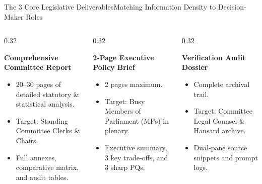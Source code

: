 \documentclass[aspectratio=169, 10pt]{beamer}
\begin{document}
\begin{frame}{The 3 Core Legislative Deliverables}{Matching Information Density to Decision-Maker Roles}
  \begin{columns}[t]
    \begin{column}{0.32\textwidth}
      \begin{tcolorbox}[colback=lightgrey, colframe=tanzaniablue, arc=1.2mm, boxrule=0.7pt, title=\textbf{Deliverable 1: Report}]
        \scriptsize
        \textbf{\textcolor{tanzaniablue}{Comprehensive Committee Report}}
        \begin{itemize}
          \item 20--30 pages of detailed statutory \& statistical analysis.
          \item Target: Standing Committee Clerks \& Chairs.
          \item Full annexes, comparative matrix, and audit tables.
        \end{itemize}
      \end{tcolorbox}
    \end{column}
    \begin{column}{0.32\textwidth}
      \begin{tcolorbox}[colback=lightgrey, colframe=suagreen, arc=1.2mm, boxrule=0.7pt, title=\textbf{Deliverable 2: Brief}]
        \scriptsize
        \textbf{\textcolor{suagreen}{2-Page Executive Policy Brief}}
        \begin{itemize}
          \item 2 pages maximum.
          \item Target: Busy Members of Parliament (MPs) in plenary.
          \item Executive summary, 3 key trade-offs, and 3 sharp PQs.
        \end{itemize}
      \end{tcolorbox}
    \end{column}
    \begin{column}{0.32\textwidth}
      \begin{tcolorbox}[colback=lightgrey, colframe=darkcharcoal, arc=1.2mm, boxrule=0.7pt, title=\textbf{Deliverable 3: Dossier}]
        \scriptsize
        \textbf{\textcolor{darkcharcoal}{Verification Audit Dossier}}
        \begin{itemize}
          \item Complete archival trail.
          \item Target: Committee Legal Counsel \& Hansard archive.
          \item Dual-pane source snippets and prompt logs.
        \end{itemize}
      \end{tcolorbox}
    \end{column}
  \end{columns}
\end{frame}
\end{document}
